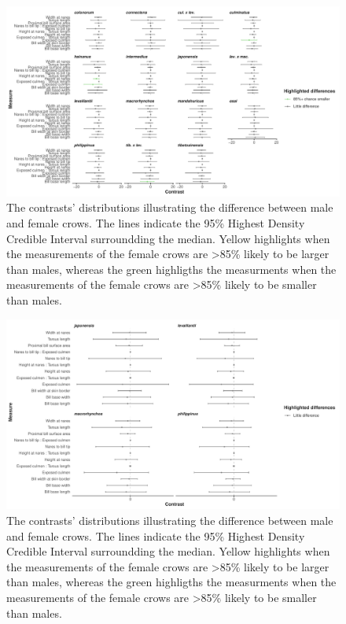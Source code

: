 \documentclass[10pt,a4paper]{article}
\begin{document}
\begin{figure}
\includegraphics[width=0.9\linewidth]{../Figures/klockSpecies_HDCI_intraSubspeciesSex_contrasts} \caption{The contrasts' distributions illustrating the difference between male and female crows. The lines indicate the 95\% Highest Density Credible Interval surroundding the median. Yellow highlights when the measurements of the female crows are >85\% likely to be larger than males, whereas the green highligths the measurments when the measurements of the female crows are >85\% likely to be smaller than males.}\label{fig:sexKlockContrasts}
\end{figure}

\begin{figure}
\includegraphics[width=0.9\linewidth]{../Figures/martSpecies_HDCI_intraSubspeciesSex_contrasts} \caption{The contrasts' distributions illustrating the difference between male and female crows. The lines indicate the 95\% Highest Density Credible Interval surroundding the median. Yellow highlights when the measurements of the female crows are >85\% likely to be larger than males, whereas the green highligths the measurments when the measurements of the female crows are >85\% likely to be smaller than males.}\label{fig:sexMartensContrasts}
\end{figure}
\end{document}
